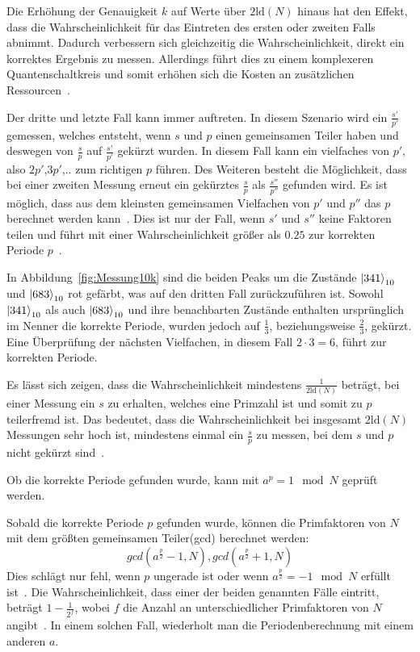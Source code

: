 Die Erhöhung der Genauigkeit \(k\) auf Werte über \(2\text{ld}(N)\) hinaus hat den Effekt, 
dass die Wahrscheinlichkeit für das Eintreten des ersten oder zweiten Falls abnimmt.
Dadurch verbessern sich gleichzeitig die Wahrscheinlichkeit, direkt ein korrektes Ergebnis zu messen.
Allerdings führt dies zu einem komplexeren Quantenschaltkreis und 
somit erhöhen sich die Kosten an zusätzlichen Ressourcen~\autocite[229]{nielsen_chuang_2010}.

Der dritte und letzte Fall kann immer auftreten.
In diesem Szenario wird ein \(\frac{s'}{p'}\) gemessen, 
welches entsteht, wenn \(s\) und \(p\) einen gemeinsamen Teiler haben und 
deswegen von \(\frac{s}{p}\) auf \(\frac{s'}{p'}\) gekürzt wurden.
In diesem Fall kann ein vielfaches von \(p'\), also \(2p'\),\(3p'\),.. zum richtigen \(p\) führen.
Des Weiteren besteht die Möglichkeit, 
dass bei einer zweiten Messung erneut ein gekürztes \(\frac{s}{p}\) als \(\frac{s''}{p''}\) gefunden wird.
Es ist möglich, dass aus dem kleinsten gemeinsamen Vielfachen von \(p'\) und \(p''\) das \(p\) berechnet werden kann~\cite{Shor_1997}.
Dies ist nur der Fall, wenn \(s'\) und \(s''\) keine Faktoren teilen und 
führt mit einer Wahrscheinlichkeit größer als \(0.25\) zur korrekten Periode \(p\)~\autocite[231]{nielsen_chuang_2010}.

In Abbildung~\ref{fig:Messung10k} sind die beiden Peaks um die Zustände \(\ket{341}_{10}\) und \(\ket{683}_{10}\) rot gefärbt, 
was auf den dritten Fall zurückzuführen ist.
Sowohl \(\ket{341}_{10}\) als auch \(\ket{683}_{10}\) und ihre benachbarten Zustände 
enthalten ursprünglich im Nenner die korrekte Periode, 
wurden jedoch  auf \(\frac{1}{3}\), beziehungsweise \(\frac{2}{3}\), gekürzt. 
Eine Überprüfung der nächsten Vielfachen, in diesem Fall \(2 \cdot 3 = 6 \), führt zur korrekten Periode.

Es lässt sich zeigen, dass die Wahrscheinlichkeit mindestens \(\frac{1}{2\text{ld}(N)}\) beträgt, 
bei einer Messung ein \(s\) zu erhalten, welches eine Primzahl ist und somit zu \(p\) teilerfremd ist.
Das bedeutet, dass die Wahrscheinlichkeit bei insgesamt \(2\text{ld}(N)\) Messungen sehr hoch ist, 
mindestens einmal ein \(\frac{s}{p}\) zu messen, 
bei dem \(s\) und \(p\) nicht gekürzt sind~\autocite[231]{nielsen_chuang_2010}.

Ob die korrekte Periode gefunden wurde, kann mit \(a^p = 1 \mod N\) geprüft werden.

Sobald die korrekte Periode \(p\) gefunden wurde, 
können die Primfaktoren von \(N\) mit dem größten gemeinsamen Teiler(gcd) berechnet werden:
\[gcd(a^{\frac{p}{2}}-1, N), gcd(a^{\frac{p}{2}}+1, N)\]
Dies schlägt nur fehl, 
wenn \(p\) ungerade ist
oder wenn \(a^{\frac{p}{2}} = -1 \mod N\) erfüllt ist~\cite{Shor_1997}.
Die Wahrscheinlichkeit, dass einer der beiden genannten Fälle eintritt, beträgt \(1-\frac{1}{2^f}\), 
wobei \(f\) die Anzahl an unterschiedlicher Primfaktoren von \(N\) angibt~\cite{Shor_1997}.
In einem solchen Fall, wiederholt man die Periodenberechnung mit einem anderen \(a\).

